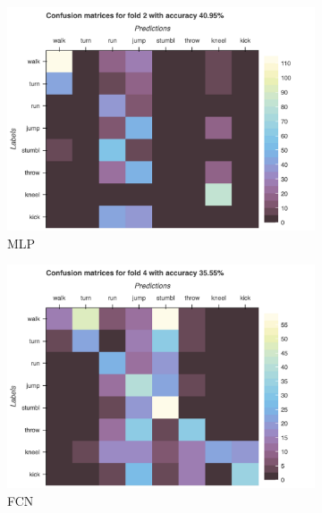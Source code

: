 		\begin{figure}[H]
			\centering
			\begin{subfigure}[b]{0.49\textwidth}
				\centering
				\includegraphics[width=\textwidth]{img/MLP-confusion_matrix_simplified.png}
				\caption{MLP}
			\end{subfigure}
			\hfill
			\begin{subfigure}[b]{0.49\textwidth}
				\centering
				\includegraphics[width=\textwidth]{img/FCN-confusion_matrix_simplified.png}
				\caption{FCN}
			\end{subfigure}
			\hfill
			\begin{subfigure}[b]{0.49\textwidth}
				\centering

\end{subfigure}
\end{figure}
